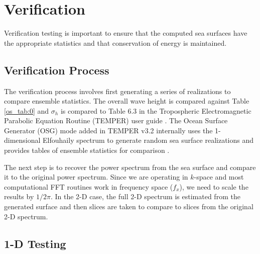 \section{Verification}
Verification testing is important to ensure that the computed sea surfaces have the appropriate statistics and that conservation of energy is maintained.

\subsection{Verification Process}
The verification process involves first generating a series of realizations to compare ensemble statistics. The overall wave height is compared against Table \ref{os_tab:0} and $\sigma_h$ is compared to Table 6.3 in the Tropospheric Electromagnetic Parabolic Equation Routine (TEMPER) user guide \cite{temper_guide}. The Ocean Surface Generator (OSG) mode added in TEMPER v3.2 internally uses the 1-dimensional Elfouhaily spectrum to generate random sea surface realizations and provides tables of ensemble statistics for comparison \cite{temper_guide}. 

The next step is to recover the power spectrum from the sea surface and compare it to the original power spectrum. Since we are operating in $k$-space and most computational FFT routines work in frequency space ($f_x$), we need to scale the results by $1/2\pi$. In the 2-D case, the full 2-D spectrum is estimated from the generated surface and then slices are taken to compare to slices from the original 2-D spectrum. 

\subsection{1-D Testing}
